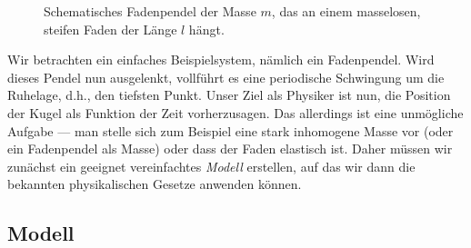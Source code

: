 \begin{figure}
  \centering
  \newcommand{\auslenkung}{50}
  \newcommand{\kraft}{1.5}
  \caption{Schematisches Fadenpendel der Masse $m$, das an einem
    masselosen, steifen Faden der Länge $l$ hängt.}
  \label{fig:pendel}
\end{figure}

Wir betrachten ein einfaches Beispielsystem, nämlich ein Fadenpendel.
Wird dieses Pendel nun ausgelenkt, vollführt es eine periodische
Schwingung um die Ruhelage, d.h., den tiefsten Punkt. Unser Ziel als
Physiker ist nun, die Position der Kugel als Funktion der Zeit
vorherzusagen. Das allerdings ist eine unmögliche Aufgabe --- man
stelle sich zum Beispiel eine stark inhomogene Masse vor (oder ein
Fadenpendel als Masse) oder dass der Faden elastisch ist. Daher müssen
wir zunächst ein geeignet vereinfachtes \emph{Modell} erstellen, auf
das wir dann die bekannten physikalischen Gesetze anwenden
können.

\subsection{Modell}

